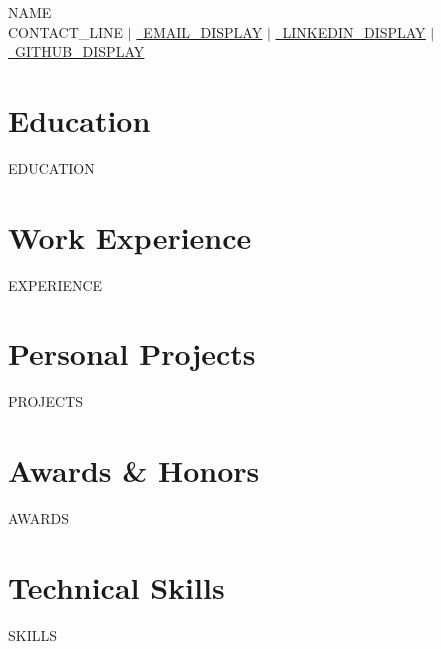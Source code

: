 \documentclass[letterpaper,11pt]{article}
\newcommand{\resumeSubHeadingListStart}{\begin{itemize}[leftmargin=0.0in, label={}]}
\newcommand{\resumeSubHeadingListEnd}{\end{itemize}}
\begin{document}
    \begin{center}
        {\Huge\scshape {{NAME}}}
        \\ \footnotesize {{CONTACT_LINE}} $|$
        \href{{{EMAIL_URL}}}{\raisebox{-0.2\height}\faEnvelope\  \underline{{{EMAIL_DISPLAY}}}} $|$
        \href{{{LINKEDIN_URL}}}{\raisebox{-0.2\height}\faLinkedin\ \underline{{{LINKEDIN_DISPLAY}}}} $|$
        \href{{{GITHUB_URL}}}{\raisebox{-0.2\height}\faGithub\ \underline{{{GITHUB_DISPLAY}}}}
    \end{center}

\section{Education}
  \resumeSubHeadingListStart
{{EDUCATION}}
  \resumeSubHeadingListEnd

\section{Work Experience}
  \resumeSubHeadingListStart
{{EXPERIENCE}}
  \resumeSubHeadingListEnd

\section{Personal Projects}
\resumeSubHeadingListStart
{{PROJECTS}}
\resumeSubHeadingListEnd

\section{Awards \& Honors}
\resumeSubHeadingListStart
{{AWARDS}}
\resumeSubHeadingListEnd

\section{Technical Skills}
\begin{itemize}
[leftmargin=0.15in, label={}]\small{\item{
{{SKILLS}}
}}
\end{itemize}

\end{document}
